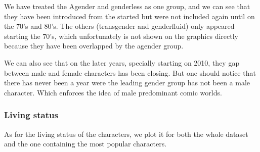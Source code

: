 We have treated the Agender and genderless as one group, and we can see that they have been introduced from the started but were not included again until on the 70's and 80's. The others (transgender and genderfluid)  only appeared starting the 70's, which unfortunately is not shown on the graphics directly because they have been overlapped by the agender group.

We can also see that on the later years, specially starting on 2010, they gap between male and female characters has been closing. But one should notice that there has never been a year were the leading gender group has not been a male character. Which enforces the idea of male predominant comic worlds.

\subsubsection{Living status}

As for the living status of the characters, we plot it for both the whole dataset and the one containing the most popular characters.

